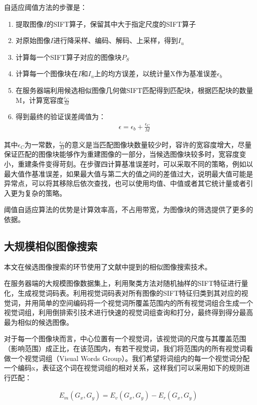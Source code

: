 \documentclass[UTF8]{csoarticle}
\begin{document}
自适应阈值方法的步骤是：
\begin{enumerate}
\item 提取图像\(I\)的SIFT算子，保留其中大于指定尺度的SIFT算子
\item 对原始图像\(I\)进行降采样、编码、解码、上采样，得到\(I_u\)
\item 计算每一个SIFT算子对应的图像块\(P_S\)
\item 计算每一个图像块在\(I\)和\(I_u\)上的均方误差，以统计量X作为基准误差\(\epsilon_b\)
\item 在服务器端利用候选相似图像几何做SIFT匹配得到匹配块，根据匹配块的数量M，计算宽容度\(\frac{\epsilon_C}{M}\)
\item 得到最终的验证误差阈值为：
\begin{align}
\epsilon = \epsilon_b + \frac{\epsilon_C}{M}
\end{align}
\end{enumerate}

其中\(\epsilon_C\)为一常数，\(\frac{\epsilon_C}{M}\)的意义是当匹配图像块数量较少时，容许的宽容度增大，尽量保证匹配的图像块能够作为重建图像的一部分，当候选图像块较多时，宽容度变小，重建条件变得苛刻。在步骤四计算基准误差时，可以采取不同的策略，例如以最大值作基准误差，如果最大值与第二大的值之间的差值过大，说明最大值可能是异常点，可以将其移除后依次查找，也可以使用均值、中值或者其它统计量或者引入更为复杂的策略。

阈值自适应算法的优势是计算效率高，不占用带宽，为图像块的筛选提供了更多的依据。

\subsection{大规模相似图像搜索}
本文在候选图像搜索的环节使用了文献\cite{Dai:2012vn}中提到的相似图像搜索技术。

在服务器端的大规模图像数据集上，利用聚类方法对随机抽样的SIFT特征进行量化，生成视觉词码表。利用视觉词码表对所有图像的SIFT特征归类到其对应的视觉词，并用简单的空间编码将一个视觉词所覆盖范围内的所有视觉词组合生成一个视觉词组，利用倒排索引技术进行快速的视觉词组查询和打分，最终得到得分最高最为相似的候选图像。

对于每一个图像块而言，中心位置有一个视觉词，该视觉词的尺度与其覆盖范围（影响范围）成正比，在该范围内，有若干视觉词，我们将范围内的所有视觉词看做一个视觉词组（Visual Words Group）。我们希望将词组内的每一个视觉词分配一个编码x，表征这个词在视觉词组的相对关系，这样我们可以采用如下的规则进行匹配：

\begin{align}
\label{eq:rate}
E_m(G_x,G_y) = E_v(G_x,G_y) - E_r(G_x,G_y)
\end{align}
\end{document}
